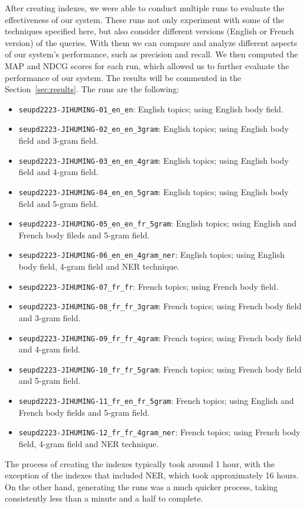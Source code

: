 After creating indexes, we were able to conduct multiple runs to evaluate the effectiveness of our system.
These runs not only experiment with some of the techniques specified here, but also consider different versions (English
or French version) of the queries.
With them we can compare and analyze different aspects of our system's performance, such as precision and recall.
We then computed the MAP and NDCG scores for each run, which allowed us to further evaluate the performance of our
system.
The results will be commented in the Section~\ref{sec:results}.
The runs are the following:
\begin{itemize}
	\item \texttt{seupd2223-JIHUMING-01\_en\_en}: English topics; using English body field.
	\item \texttt{seupd2223-JIHUMING-02\_en\_en\_3gram}: English topics; using English body field and 3-gram field.
	\item \texttt{seupd2223-JIHUMING-03\_en\_en\_4gram}: English topics; using English body field and 4-gram field.
	\item \texttt{seupd2223-JIHUMING-04\_en\_en\_5gram}: English topics; using English body field and 5-gram field.
	\item \texttt{seupd2223-JIHUMING-05\_en\_en\_fr\_5gram}: English topics; using English and French body fileds and 5-gram field.
	\item \texttt{seupd2223-JIHUMING-06\_en\_en\_4gram\_ner}: English topics; using English body field, 4-gram field and NER technique.
	\item \texttt{seupd2223-JIHUMING-07\_fr\_fr}: French topics; using French body field.
	\item \texttt{seupd2223-JIHUMING-08\_fr\_fr\_3gram}: French topics; using French body field and 3-gram field.
	\item \texttt{seupd2223-JIHUMING-09\_fr\_fr\_4gram}: French topics; using French body field and 4-gram field.
	\item \texttt{seupd2223-JIHUMING-10\_fr\_fr\_5gram}: French topics; using French body field and 5-gram field.
	\item \texttt{seupd2223-JIHUMING-11\_fr\_en\_fr\_5gram}: French topics; using English and French body fields and 5-gram field.
	\item \texttt{seupd2223-JIHUMING-12\_fr\_fr\_4gram\_ner}: French topics; using French body field, 4-gram field and NER technique.
\end{itemize}

The process of creating the indexes typically took around 1 hour, with the exception of the indexes that included NER,
which took approximately 16 hours.
On the other hand, generating the runs was a much quicker process, taking consistently less than a minute and a half to
complete.


